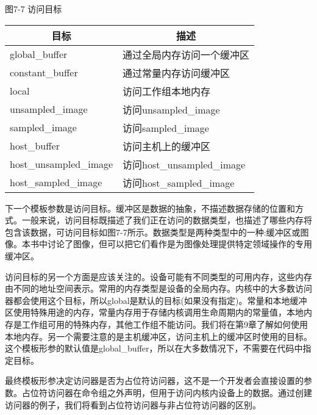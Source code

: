 \hspace*{\fill} \par %
图7-7 访问目标
\begin{table}[H]
	\begin{tabular}{|l|l|}
		\hline
		\multicolumn{1}{|c|}{目标} & \multicolumn{1}{c|}{描述}        \\ \hline
		global\_buffer               & 通过全局内存访问一个缓冲区   \\ \hline
		constant\_buffer             & 通过常量内存访问缓冲区 \\ \hline
		local                        & 访问工作组本地内存          \\ \hline
		unsampled\_image             & 访问unsampled\_image              \\ \hline
		sampled\_image               & 访问sampled\_image                 \\ \hline
		host\_buffer                 & 访问主机上的缓冲区             \\ \hline
		host\_unsampled\_image       & 访问host\_unsampled\_image  \\ \hline
		host\_sampled\_image         & 访问host\_sampled\_image      \\ \hline
	\end{tabular}
\end{table}

下一个模板参数是访问目标。缓冲区是数据的抽象，不描述数据存储的位置和方式。一般来说，访问目标既描述了我们正在访问的数据类型，也描述了哪些内存将包含该数据，可访问目标如图7-7所示。数据类型是两种类型中的一种:缓冲区或图像。本书中讨论了图像，但可以把它们看作是为图像处理提供特定领域操作的专用缓冲区。\par

访问目标的另一个方面是应该关注的。设备可能有不同类型的可用内存，这些内存由不同的地址空间表示。常用的内存类型是设备的全局内存。内核中的大多数访问器都会使用这个目标，所以global是默认的目标(如果没有指定)。常量和本地缓冲区使用特殊用途的内存，常量内存用于存储内核调用生命周期内的常量值，本地内存是工作组可用的特殊内存，其他工作组不能访问。我们将在第9章了解如何使用本地内存。另一个需要注意的是主机缓冲区，访问主机上的缓冲区时使用的目标。这个模板形参的默认值是global\_buffer，所以在大多数情况下，不需要在代码中指定目标。\par

最终模板形参决定访问器是否为占位符访问器，这不是一个开发者会直接设置的参数。占位符访问器在命令组之外声明，但用于访问内核内设备上的数据。通过创建访问器的例子，我们将看到占位符访问器与非占位符访问器的区别。\par

